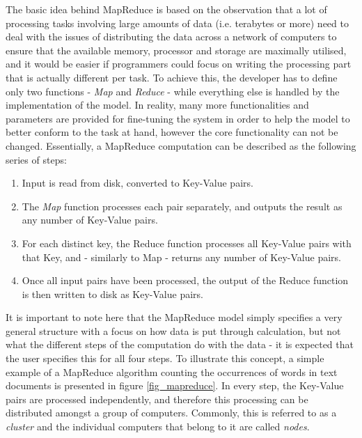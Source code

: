 \documentclass [12pt,a4paper]{report}
\begin{document}
The basic idea behind MapReduce is based on the observation that a lot of processing tasks involving large amounts of data (i.e. terabytes or more) need to deal with the issues of distributing the data across a network of computers to ensure that the available memory, processor and storage are maximally utilised, and it would be easier if programmers could focus on writing the processing part that is actually different per task. To achieve this, the developer has to define only two functions - \textit{Map} and \textit{Reduce} - while everything else is handled by the implementation of the model. In reality, many more functionalities and parameters are provided for fine-tuning the system in order to help the model to better conform to the task at hand, however the core functionality can not be changed. Essentially, a MapReduce computation can be described as the following series of steps:

\begin{enumerate}
\item Input is read from disk, converted to Key-Value pairs.
\item The \textit{Map} function processes each pair separately, and outputs the result as any number of Key-Value pairs.
\item For each distinct key, the Reduce function processes all Key-Value pairs with that Key, and - similarly to Map - returns any number of Key-Value pairs.
\item Once all input pairs have been processed, the output of the Reduce function is then written to disk as Key-Value pairs. 
\end{enumerate}

It is important to note here that the MapReduce model simply specifies a very general structure with a focus on how data is put through calculation, but not what the different steps of the computation do with the data - it is expected that the user specifies this for all four steps. To illustrate this concept, a simple example of a MapReduce algorithm counting the occurrences of words in text documents is presented in figure \ref{fig_mapreduce}. In every step, the Key-Value pairs are processed independently, and therefore this processing can be distributed amongst a group of computers. Commonly, this is referred to as a \textit{cluster} and the individual computers that belong to it are called \textit{nodes}.
\end{document}
